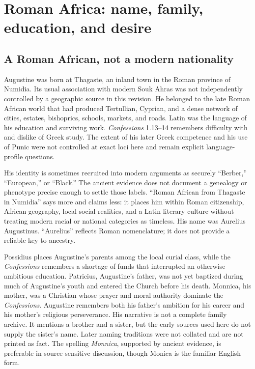 \section{Roman Africa: name, family, education, and desire}\label{sec:aug-youth}

\subsection{A Roman African, not a modern nationality}

Augustine was born at Thagaste, an inland town in the Roman province of
Numidia. Its usual association with modern Souk Ahras was not independently
controlled by a geographic source in this revision. He belonged to
the late Roman African world that had produced Tertullian, Cyprian, and a dense
network of cities, estates, bishoprics, schools, markets, and roads. Latin was
the language of his education and surviving work. \emph{Confessions} 1.13--14
remembers difficulty with and dislike of Greek study. The extent of his later
Greek competence and his use of Punic were not controlled at exact loci here
and remain explicit language-profile questions.

His identity is sometimes recruited into modern arguments as securely
“Berber,” “European,” or “Black.” The ancient evidence does not document
a genealogy or phenotype precise enough to settle those labels. “Roman
African from Thagaste in Numidia” says more and claims less: it places him
within Roman citizenship, African geography, local social realities, and a
Latin literary culture without treating modern racial or national categories
as timeless. His name was Aurelius Augustinus. “Aurelius” reflects Roman
nomenclature; it does not provide a reliable key to ancestry.

Possidius places Augustine's parents among the local curial class, while the
\emph{Confessions} remembers a shortage of funds that interrupted an otherwise
ambitious education. Patricius, Augustine's father, was not yet baptized during
much of Augustine's youth and entered the Church before his death. Monnica, his
mother, was a Christian whose prayer and moral authority dominate the
\emph{Confessions}. Augustine remembers both his father's ambition for his
career and his mother's religious perseverance. His narrative is not a
complete family archive. It mentions a brother and a sister, but the early
sources used here do not supply the sister's name. Later naming traditions were
not collated and are not printed as fact. The spelling \emph{Monnica}, supported by ancient evidence, is
preferable in source-sensitive discussion, though Monica is the familiar
English form.

